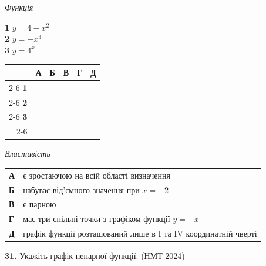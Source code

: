 \documentclass[14pt]{extarticle}
\newcommand{\nmtyear}[1]{\hfill{\small\color{yearcolor}(НМТ #1)}}
\begin{document}
\vspace{0.3cm}

\noindent
\begin{minipage}[t]{0.40\textwidth}
    \textit{Функція} \par \vspace{0.2cm}
    \textbf{1} \quad $y = 4 - x^2$ \\[0.2cm]
    \textbf{2} \quad $y = -x^3$ \\[0.2cm]
    \textbf{3} \quad $y = 4^x$
    
    \vspace{0.5cm}
    
    \begingroup
    \setlength{\tabcolsep}{4pt}
    \renewcommand{\arraystretch}{1.2}
    \small
    \begin{tabular}{r|c|c|c|c|c|}
         \multicolumn{1}{c}{} & \multicolumn{1}{c}{\textbf{А}} & \multicolumn{1}{c}{\textbf{Б}} & \multicolumn{1}{c}{\textbf{В}} & \multicolumn{1}{c}{\textbf{Г}} & \multicolumn{1}{c}{\textbf{Д}} \\ \cline{2-6}
         \textbf{1} & & & & & \\ \cline{2-6}
         \textbf{2} & & & & & \\ \cline{2-6}
         \textbf{3} & & & & & \\ \cline{2-6}
    \end{tabular}
    \endgroup
\end{minipage}%
\hfill
\begin{minipage}[t]{0.55\textwidth}
    \textit{Властивість} \par \vspace{0.2cm}
    \begin{tabular}{l p{6.5cm}}
    \textbf{А} & є зростаючою на всій області визначення \\
    \textbf{Б} & набуває від’ємного значення при $x = -2$ \\
    \textbf{В} & є парною \\
    \textbf{Г} & має три спільні точки з графіком функції $y = -x$ \\
    \textbf{Д} & графік функції розташований лише в I та IV координатній чверті \\
    \end{tabular}
\end{minipage}

\vspace{0.7cm}

\noindent\textbf{31.} Укажіть графік непарної функції. \nmtyear{2024}
\end{document}
